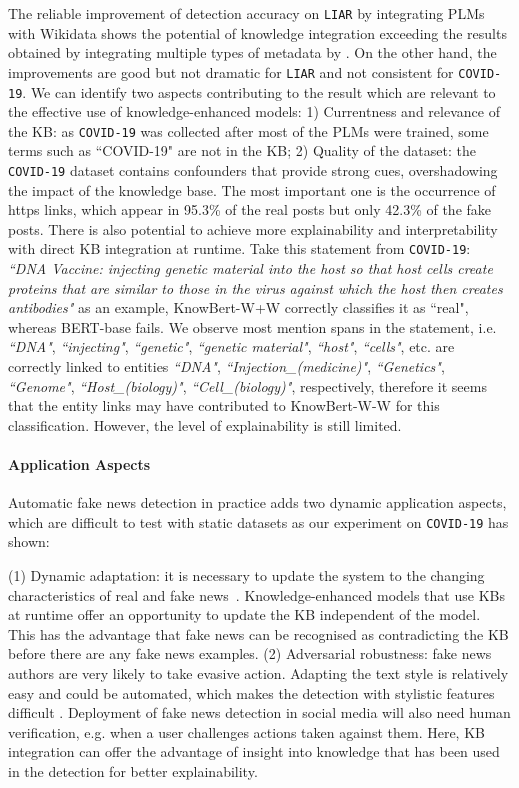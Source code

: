 \documentclass[letterpaper]{article} %
\begin{document}
The reliable improvement of detection accuracy on \texttt{LIAR} by integrating PLMs with Wikidata shows the potential of knowledge integration exceeding the results obtained by integrating multiple types of metadata by \citet{wang-2017-liar}.
On the other hand, the improvements are good but not dramatic for \texttt{LIAR} and not consistent for \texttt{COVID-19}.
We can identify two aspects contributing to the result which are relevant to the effective use of knowledge-enhanced models:  1) Currentness and relevance of the KB: as \texttt{COVID-19} was collected after most of the PLMs were trained, some terms such as ``COVID-19" are not in the KB;  2) Quality of the dataset:
the \texttt{COVID-19} dataset contains confounders that provide strong cues, overshadowing the impact of the knowledge base.
The most important one is the occurrence of https links, which appear in 95.3\% of the real posts but only 42.3\% of the fake posts.  There is also potential to achieve more explainability and interpretability with direct KB integration at runtime.
Take this statement from \texttt{COVID-19}: \textit{``DNA Vaccine: injecting genetic material into the host so that host cells create proteins that are similar to those in the virus against which the host then creates antibodies"} as an example,
KnowBert-W+W correctly classifies it as ``real", whereas BERT-base fails.
We observe most mention spans in the statement, i.e.  \textit{``DNA"}, \textit{``injecting"}, \textit{``genetic"}, \textit{``genetic material"}, \textit{``host"}, \textit{``cells"}, etc. are correctly linked to entities \textit{``DNA"}, \textit{``Injection\_(medicine)"}, \textit{``Genetics"}, \textit{``Genome"}, \textit{``Host\_(biology)"}, \textit{``Cell\_(biology)"}, respectively,
therefore it seems that the entity links may have contributed to KnowBert-W-W for this classification.
However, the level of explainability is still limited.


\paragraph{Application Aspects}
Automatic fake news detection in practice adds two dynamic application aspects, which are difficult to test with static datasets as our experiment on \texttt{COVID-19} has shown:

(1) Dynamic adaptation: it is necessary to update the system to the changing characteristics of real and fake news~\cite{silva2021concept}.
Knowledge-enhanced models that use KBs at runtime offer an opportunity to update the KB independent of the model. %
This has the advantage that fake news can be recognised as contradicting the KB before there are any fake news examples.  (2) Adversarial robustness: fake news authors are very likely to take evasive action.
Adapting the text style is relatively easy and could be automated, which makes the detection with stylistic features difficult \citep[see][]{NEURIPS2019_3e9f0fc9, schuster-etal-2020-limitations}.  Deployment of fake news detection in social media will also need human verification, e.g. when a user challenges actions taken against them.
Here, KB integration can offer the advantage of insight into knowledge that has been used in the detection for better explainability.
\end{document}
